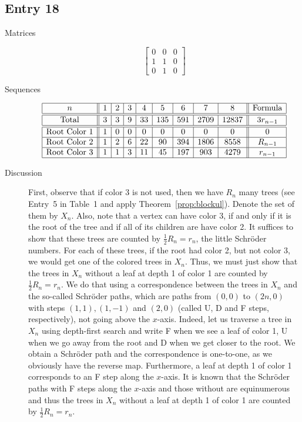 \documentclass[12pt]{amsart}
\begin{document}
\subsection*{Entry 18}
\begin{description}
    \item[Matrices]
    
    \[\begin{bmatrix}
0 & 0 & 0 \\
1 & 1 & 0 \\
0 & 1 & 0
\end{bmatrix}\]
    \item[Sequences]\hspace*{\fill}\vspace{-0.5cm}
    \begin{center}
        \[
        \begin{array}{|c||c|c|c|c|c|c|c|c||c|}\hline
           n  & 1 & 2 & 3 & 4 & 5 & 6 & 7 & 8  & \text{Formula}\\\hline\hline
           \text{Total}  & 3 & 3 & 9 & 33 & 135 & 591 & 2709 & 12837 & 3r_{n-1}\\\hline\hline
           \text{Root Color }1 & 1 & 0 & 0 & 0 & 0 & 0 & 0 & 0 & 0\\\hline
           \text{Root Color }2 & 1 & 2 & 6 & 22 & 90 & 394 & 1806 & 8558 & R_{n-1}\\\hline
           \text{Root Color }3 & 1 & 1 & 3 & 11 & 45 & 197 & 903 & 4279 & r_{n-1}\\\hline
        \end{array}
        \]
    \end{center}
    
    \item[Discussion] First, observe that if color 3 is not used, then we have $R_n$ many trees (see Entry~5 in Table~1 and apply Theorem~\ref{prop:blockul}). Denote the set of them by $X_n$. Also, note that a vertex can have color 3, if and only if it is the root of the tree and if all of its children are have color 2. It suffices to show that these trees are counted by $\frac{1}{2}R_{n} = r_{n}$, the little Schr\"{o}der numbers. For each of these trees, if the root had color 2, but not color 3, we would get one of the colored trees in $X_n$. Thus, we must just show that the trees in $X_n$ without a leaf at depth 1 of color 1 are counted by $\frac{1}{2}R_{n} = r_{n}$. We do that using a correspondence between the trees in $X_n$ and the so-called Schr\"{o}der paths, which are paths from $(0,0)$ to $(2n,0)$ with steps $(1,1), (1,-1)$ and $(2,0)$ (called U, D and F steps, respectively), not going above the 
    $x$-axis. Indeed, let us traverse a tree in $X_n$ using depth-first search and write F when we see a leaf of color 1, U when we go away from the root and D when we get closer to the root. We obtain a Schr\"{o}der path and the correspondence is one-to-one, as we obviously have the reverse map. Furthermore, a leaf at depth 1 of color 1 corresponds to an F step along the $x$-axis. 
    It is known that the Schr\"{o}der paths with F steps along the $x$-axis 
    and those without 
    are equinumerous and thus the trees in $X_n$ without a leaf at depth 1 of color 1 are counted by $\frac{1}{2}R_{n} = r_{n}$.
\end{description}
\end{document}
